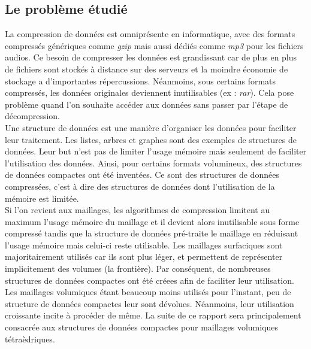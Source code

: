 \subsection*{Le problème étudié}
\noindent
La compression de données est omniprésente en informatique, avec des formats compressés génériques comme \textit{gzip} mais aussi dédiés comme \textit{mp3} pour les fichiers audios. Ce besoin de compresser les données est grandissant car de plus en plus de fichiers sont stockés à distance sur des serveurs et la moindre économie de stockage a d'importantes répercussions. Néanmoins, sous certains formats compressés, les données originales deviennent inutilisables (ex : \textit{rar}). Cela pose problème quand l'on souhaite accéder aux données  sans passer par l'étape de décompression.\\
Une structure de données est une manière d'organiser les données pour faciliter leur traitement. Les listes, arbres et graphes sont des exemples de structures de données. Leur but n'est pas de limiter l'usage mémoire mais seulement de faciliter l'utilisation des données. Ainsi, pour certains formats volumineux, des structures de données compactes ont été inventées. Ce sont des structures de données compressées, c'est à dire des structures de données dont l'utilisation de la mémoire est limitée.\\
Si l'on revient aux maillages, les algorithmes de compression limitent au maximum l'usage mémoire du maillage et il devient alors inutilisable sous forme compressé tandis que la structure de données pré-traite le maillage en réduisant l'usage mémoire mais celui-ci reste utilisable. Les maillages surfaciques sont majoritairement utilisés car ils sont plus léger, et permettent de représenter implicitement des volumes (la frontière). Par conséquent, de nombreuses structures de données compactes ont été créees afin de faciliter leur utilisation. Les maillages volumiques étant beaucoup moins utilisés pour l'instant, peu de structure de données compactes leur sont dévolues. Néanmoins, leur utilisation croissante incite à procéder de même. La suite de ce rapport sera principalement consacrée aux structures de données compactes pour maillages volumiques tétraèdriques.

